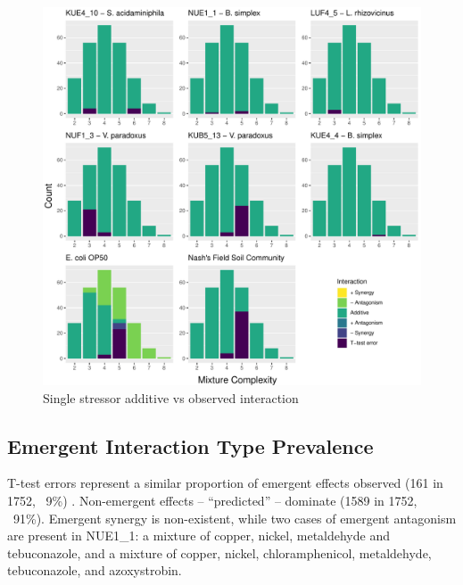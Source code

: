 \documentclass[final,1p,times]{elsarticle}
\begin{document}
\begin{figure}[hb]
    \centering
    \includegraphics[width = \textwidth]{Scripts/Results/Final_Pipeline/histogram_interaction_basic.pdf}
    \caption{Single stressor additive vs observed interaction}
    \label{fig:histogram_interaction_basic}
\end{figure}

\newpage
\subsection{Emergent Interaction Type Prevalence}
\label{S:3:7}

T-test errors represent a similar proportion of emergent effects observed (161 in 1752, ~9\%) . Non-emergent effects – “predicted” – dominate (1589 in 1752, ~91\%). Emergent synergy is non-existent, while two cases of emergent antagonism are present in NUE1\_1: a mixture of copper, nickel, metaldehyde and tebuconazole, and a mixture of copper, nickel, chloramphenicol, metaldehyde, tebuconazole, and azoxystrobin.
\end{document}
